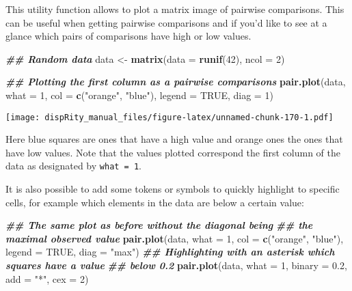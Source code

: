 \documentclass[
]{book}
\newenvironment{Shaded}{\begin{snugshade}}{\end{snugshade}}
\newcommand{\AttributeTok}[1]{\textcolor[rgb]{0.13,0.29,0.53}{#1}}
\newcommand{\ConstantTok}[1]{\textcolor[rgb]{0.56,0.35,0.01}{#1}}
\newcommand{\DecValTok}[1]{\textcolor[rgb]{0.00,0.00,0.81}{#1}}
\newcommand{\DocumentationTok}[1]{\textcolor[rgb]{0.56,0.35,0.01}{\textbf{\textit{#1}}}}
\newcommand{\FloatTok}[1]{\textcolor[rgb]{0.00,0.00,0.81}{#1}}
\newcommand{\FunctionTok}[1]{\textcolor[rgb]{0.13,0.29,0.53}{\textbf{#1}}}
\newcommand{\NormalTok}[1]{#1}
\newcommand{\OtherTok}[1]{\textcolor[rgb]{0.56,0.35,0.01}{#1}}
\newcommand{\StringTok}[1]{\textcolor[rgb]{0.31,0.60,0.02}{#1}}
\begin{document}
This utility function allows to plot a matrix image of pairwise comparisons.
This can be useful when getting pairwise comparisons and if you'd like to see at a glance which pairs of comparisons have high or low values.

\begin{Shaded}
\begin{Highlighting}[]
\DocumentationTok{\#\# Random data}
\NormalTok{data }\OtherTok{\textless{}{-}} \FunctionTok{matrix}\NormalTok{(}\AttributeTok{data =} \FunctionTok{runif}\NormalTok{(}\DecValTok{42}\NormalTok{), }\AttributeTok{ncol =} \DecValTok{2}\NormalTok{)}

\DocumentationTok{\#\# Plotting the first column as a pairwise comparisons}
\FunctionTok{pair.plot}\NormalTok{(data, }\AttributeTok{what =} \DecValTok{1}\NormalTok{, }\AttributeTok{col =} \FunctionTok{c}\NormalTok{(}\StringTok{"orange"}\NormalTok{, }\StringTok{"blue"}\NormalTok{), }\AttributeTok{legend =} \ConstantTok{TRUE}\NormalTok{,}
          \AttributeTok{diag =} \DecValTok{1}\NormalTok{)}
\end{Highlighting}
\end{Shaded}

\texttt{[image: dispRity\_manual\_files/figure-latex/unnamed-chunk-170-1.pdf]}

Here blue squares are ones that have a high value and orange ones the ones that have low values.
Note that the values plotted correspond the first column of the data as designated by \texttt{what\ =\ 1}.

It is also possible to add some tokens or symbols to quickly highlight to specific cells, for example which elements in the data are below a certain value:

\begin{Shaded}
\begin{Highlighting}[]
\DocumentationTok{\#\# The same plot as before without the diagonal being}
\DocumentationTok{\#\# the maximal observed value}
\FunctionTok{pair.plot}\NormalTok{(data, }\AttributeTok{what =} \DecValTok{1}\NormalTok{, }\AttributeTok{col =} \FunctionTok{c}\NormalTok{(}\StringTok{"orange"}\NormalTok{, }\StringTok{"blue"}\NormalTok{), }\AttributeTok{legend =} \ConstantTok{TRUE}\NormalTok{,}
          \AttributeTok{diag =} \StringTok{"max"}\NormalTok{)}
\DocumentationTok{\#\# Highlighting with an asterisk which squares have a value}
\DocumentationTok{\#\# below 0.2}
\FunctionTok{pair.plot}\NormalTok{(data, }\AttributeTok{what =} \DecValTok{1}\NormalTok{, }\AttributeTok{binary =} \FloatTok{0.2}\NormalTok{, }\AttributeTok{add =} \StringTok{"*"}\NormalTok{, }\AttributeTok{cex =} \DecValTok{2}\NormalTok{)}
\end{Highlighting}
\end{Shaded}
\end{document}

